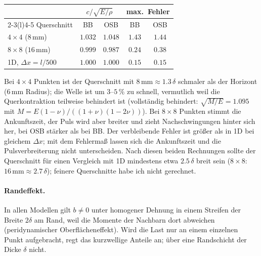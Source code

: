 \documentclass[a4paper,11pt]{article}
\begin{document}
\begin{center}
\begin{tabular}{@{}lcccc@{}}
  \toprule
  & \multicolumn{2}{c}{$c/\sqrt{E/\rho}$} & \multicolumn{2}{c}{max.\ Fehler} \\
  \cmidrule(lr){2-3}\cmidrule(l){4-5}
  Querschnitt & BB & OSB & BB & OSB \\
  \midrule
  $4\times4$ ($8\,\mathrm{mm}$)  & $1.032$ & $1.048$ & $1.43$ & $1.44$ \\
  $8\times8$ ($16\,\mathrm{mm}$) & $0.999$ & $0.987$ & $0.24$ & $0.38$ \\
  1D, $\Delta x = l/500$         & $1.000$ & $1.000$ & $0.15$ & $0.15$ \\
  \bottomrule
\end{tabular}
\end{center}

Bei $4\times4$ Punkten ist der Querschnitt mit $8\,\mathrm{mm} \approx 1.3\,\delta$ schmaler als der Horizont
($6\,\mathrm{mm}$ Radius); die Welle ist um $3$--$5\,\%$ zu schnell, vermutlich weil die Querkontraktion teilweise behindert ist
(vollständig behindert: $\sqrt{M/E} = 1.095$ mit $M = E(1-\nu)/((1+\nu)(1-2\nu))$). Bei $8\times8$ Punkten
stimmt die Ankunftszeit, der Puls wird aber breiter und zieht Nachschwingungen hinter sich her, bei OSB stärker als bei BB.
Der verbleibende Fehler ist größer als in 1D bei gleichem $\Delta x$; mit dem Fehlermaß
lassen sich die Ankunftszeit und die Pulsverbreiterung nicht unterscheiden.
Nach diesen beiden Rechnungen sollte der Querschnitt für einen Vergleich mit 1D mindestens etwa $2.5\,\delta$ breit sein
($8\times8$: $16\,\mathrm{mm} \approx 2.7\,\delta$); feinere Querschnitte habe ich nicht gerechnet.

\paragraph{Randeffekt.} In allen Modellen gilt $b\neq 0$ unter homogener Dehnung in einem Streifen der Breite $2\delta$ am Rand,
weil die Momente der Nachbarn dort abweichen (peridynamischer Oberflächeneffekt).
Wird die Last nur an einem einzelnen Punkt aufgebracht, regt das kurzwellige Anteile an; über eine Randschicht der Dicke $\delta$ nicht.
\end{document}
